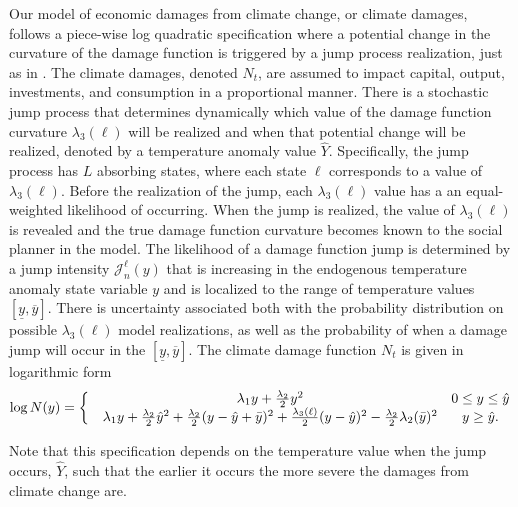 \documentclass[12pt]{article}
\begin{document}
Our model of economic damages from climate change, or climate damages, follows a piece-wise log quadratic specification where a potential change in the curvature of the damage function is triggered by a jump process realization, just as in \cite{BarnettBrockHansenZhang:2023}. The climate damages, denoted $N_t$, are assumed to impact capital, output, investments, and consumption in a proportional manner. There is a stochastic jump process that determines dynamically which value of the damage function curvature $\lambda_3(\ell)$ will be realized and when that potential change will be realized, denoted by a temperature anomaly value $\hat{Y}$. Specifically, the jump process has $L$ absorbing states, where each state $\ell$ corresponds to a value of $\lambda_3(\ell)$. Before the realization of the jump, each $\lambda_3(\ell)$ value has a an equal-weighted likelihood of occurring. When the jump is realized, the value of $\lambda_3(\ell)$ is revealed and the true damage function curvature becomes known to the social planner in the model. The likelihood of a damage function jump is determined by a jump intensity $\mathcal{J}^{\ell}_n(y)$ that is increasing in the endogenous temperature anomaly state variable $y$ and is localized to the range of temperature values $[\underline{y},\overline{y}]$. There is uncertainty associated both with the probability distribution on possible $\lambda_3(\ell)$ model realizations, as well as the probability of when a damage jump will occur in the $[\underline{y},\overline{y}]$. The climate damage function $N_t$ is given in logarithmic form
\begin{equation*}
\log N(y) = \left\{ \begin{matrix} &  \lambda_1 y + \frac {\lambda_2}  2  y^2 & 0 \le y \le {\hat y} \cr 
 &  \lambda_1 y + \frac  {\lambda_2} 2  {\hat y} ^2 + 
\frac  {\lambda_2} 2 (y - {\hat y} + {\bar y} )^2 + \frac {\lambda_3(\ell)} 2 (y- \hat y)^2 - {\frac {\lambda_2} 2}\lambda_2(\bar y)^2 & y \ge {\hat y}. \end{matrix} \right. 
\end{equation*}

Note that this specification depends on the temperature value when the jump occurs, $\hat{Y}$, such that the earlier it occurs the more severe the damages from climate change are. 


\end{document}
